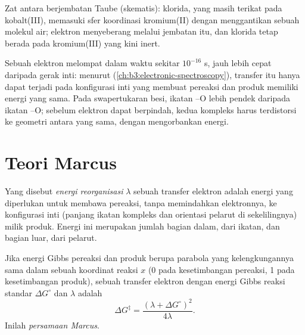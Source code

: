 \begin{omfigure}

{\small Zat antara berjembatan Taube (skematis): klorida, yang masih terikat pada
kobalt(III), memasuki sfer koordinasi kromium(II) dengan menggantikan sebuah molekul
air; elektron menyeberang melalui jembatan itu, dan klorida tetap berada pada
kromium(III) yang kini inert.}
\end{omfigure}

Sebuah elektron melompat dalam waktu sekitar $10^{-16}$ s, jauh lebih cepat daripada gerak inti: menurut
 (\cref{ch:b3:electronic-spectroscopy}), transfer itu
hanya dapat terjadi pada konfigurasi inti yang membuat pereaksi dan produk memiliki
energi yang sama. Pada swapertukaran besi, ikatan --O lebih pendek daripada
ikatan --O; sebelum elektron dapat berpindah, kedua kompleks harus terdistorsi ke
geometri antara yang sama, dengan mengorbankan energi.

\section{Teori Marcus}

\begin{definition}\label{def:b3:complex-mechanisms:reorganisation}
Yang disebut \emph{energi reorganisasi} $\lambda$ sebuah
transfer elektron adalah energi yang diperlukan untuk membawa pereaksi, tanpa
memindahkan elektronnya, ke konfigurasi inti (panjang ikatan kompleks dan
orientasi pelarut di sekelilingnya) milik produk. Energi ini merupakan jumlah
bagian dalam, dari ikatan, dan bagian luar, dari pelarut.
\end{definition}

\begin{theorem}\label{thm:b3:complex-mechanisms:marcus}
Jika energi Gibbs pereaksi dan produk berupa parabola yang kelengkungannya sama
dalam sebuah koordinat reaksi $x$ (0 pada kesetimbangan pereaksi, 1 pada kesetimbangan
produk),  sebuah transfer elektron dengan energi Gibbs
reaksi standar $\Delta G^\circ$ dan  $\lambda$ adalah
\[
  \Delta G^{\ddagger} = \frac{(\lambda + \Delta G^\circ)^2}{4\lambda} .
\]
Inilah \emph{persamaan Marcus}.
\end{theorem}

